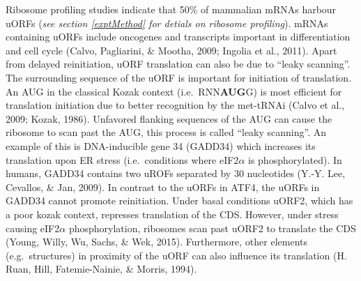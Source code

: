 \documentclass[12pt,openany]{book}
\begin{document}
Ribosome profiling studies indicate that 50\% of mammalian mRNAs harbour
uORFs (\emph{see section \ref{exptMethod} for detials on ribosome
profiling}). mRNAs containing uORFs include oncogenes and transcripts
important in differentiation and cell cycle (Calvo, Pagliarini, \&
Mootha, 2009; Ingolia et al., 2011). Apart from delayed reinitiation,
uORF translation can also be due to ``leaky scanning''. The surrounding
sequence of the uORF is important for initiation of translation. An AUG
in the classical Kozak context (i.e.~RNN\textbf{AUG}G) is most efficient
for translation initiation due to better recognition by the met-tRNAi
(Calvo et al., 2009; Kozak, 1986). Unfavored flanking sequences of the
AUG can cause the ribosome to scan past the AUG, this process is called
``leaky scanning''. An example of this is DNA-inducible gene 34 (GADD34)
which increases its translation upon ER stress (i.e.~conditions where
eIF2\(\alpha\) is phosphorylated). In humans, GADD34 contains two uROFs
separated by 30 nucleotides (Y.-Y. Lee, Cevallos, \& Jan, 2009). In
contrast to the uORFs in ATF4, the uORFs in GADD34 cannot promote
reinitiation. Under basal conditions uORF2, which has a poor kozak
context, represses translation of the CDS. However, under stress causing
eIF2\(\alpha\) phosphorylation, ribosomes scan past uORF2 to translate
the CDS (Young, Willy, Wu, Sachs, \& Wek, 2015). Furthermore, other
elements (e.g.~structures) in proximity of the uORF can also influence
its translation (H. Ruan, Hill, Fatemie-Nainie, \& Morris, 1994).
\end{document}
